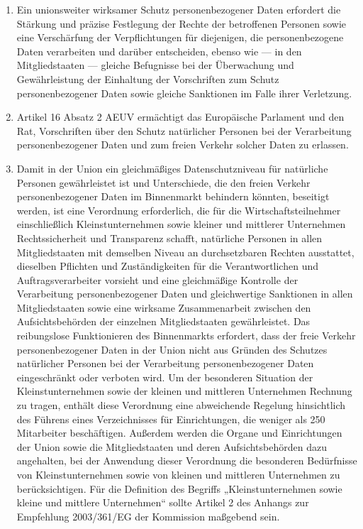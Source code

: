 \begin{enumerate}

   \item Ein unionsweiter wirksamer Schutz personenbezogener Daten erfordert die Stärkung und präzise Festlegung der
    Rechte der betroffenen Personen sowie eine Verschärfung der Verpflichtungen für diejenigen, die personenbezogene
    Daten verarbeiten und darüber entscheiden, ebenso wie — in den Mitgliedstaaten — gleiche Befugnisse bei der
    Überwachung und Gewährleistung der Einhaltung der Vorschriften zum Schutz personenbezogener Daten sowie gleiche
    Sanktionen im Falle ihrer Verletzung.%
   \label{itm:eg-11}
   

   \item Artikel 16 Absatz 2 AEUV ermächtigt das Europäische Parlament und den Rat, Vorschriften über den Schutz
    natürlicher Personen bei der Verarbeitung personenbezogener Daten und zum freien Verkehr solcher Daten zu
    erlassen.%
   \label{itm:eg-12}
   

   \item Damit in der Union ein gleichmäßiges Datenschutzniveau für natürliche Personen gewährleistet ist und
    Unterschiede, die den freien Verkehr personenbezogener Daten im Binnenmarkt behindern könnten, beseitigt werden,
    ist eine Verordnung erforderlich, die für die Wirtschaftsteilnehmer einschließlich Kleinstunternehmen sowie kleiner
    und mittlerer Unternehmen Rechtssicherheit und Transparenz schafft, natürliche Personen in allen Mitgliedstaaten
    mit demselben Niveau an durchsetzbaren Rechten ausstattet, dieselben Pflichten und Zuständigkeiten für die
    Verantwortlichen und Auftragsverarbeiter vorsieht und eine gleichmäßige Kontrolle der Verarbeitung
    personenbezogener Daten und gleichwertige Sanktionen in allen Mitgliedstaaten sowie eine wirksame Zusammenarbeit
    zwischen den Aufsichtsbehörden der einzelnen Mitgliedstaaten gewährleistet. Das reibungslose Funktionieren des
    Binnenmarkts erfordert, dass der freie Verkehr personenbezogener Daten in der Union nicht aus Gründen des Schutzes
    natürlicher Personen bei der Verarbeitung personenbezogener Daten eingeschränkt oder verboten wird. Um der
    besonderen Situation der Kleinstunternehmen sowie der kleinen und mittleren Unternehmen Rechnung zu tragen, enthält
    diese Verordnung eine abweichende Regelung hinsichtlich des Führens eines Verzeichnisses für Einrichtungen, die
    weniger als 250 Mitarbeiter beschäftigen. Außerdem werden die Organe und Einrichtungen der Union sowie die
    Mitgliedstaaten und deren Aufsichtsbehörden dazu angehalten, bei der Anwendung dieser Verordnung die besonderen
    Bedürfnisse von Kleinstunternehmen sowie von kleinen und mittleren Unternehmen zu berücksichtigen. Für die
    Definition des Begriffs „Kleinstunternehmen sowie kleine und mittlere Unternehmen“ sollte Artikel 2 des Anhangs zur
    Empfehlung 2003/361/EG der Kommission maßgebend
    sein.%
   \label{itm:eg-13}
   

\end{enumerate}
